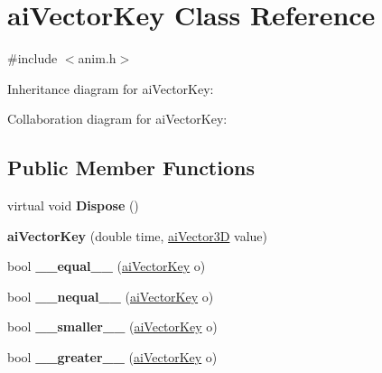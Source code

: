 \hypertarget{structai_vector_key}{\section{ai\+Vector\+Key Class Reference}
\label{structai_vector_key}
}


{\ttfamily \#include $<$anim.\+h$>$}



Inheritance diagram for ai\+Vector\+Key\+:


Collaboration diagram for ai\+Vector\+Key\+:
\subsection*{Public Member Functions}
\begin{DoxyCompactItemize}
\item 
\hypertarget{structai_vector_key_a17f1651da042834760e53b391bf48ff4}{virtual void {\bfseries Dispose} ()}\label{structai_vector_key_a17f1651da042834760e53b391bf48ff4}

\item 
\hypertarget{structai_vector_key_a1d870ec9ba129125116abaefb58e4d91}{{\bfseries ai\+Vector\+Key} (double time, \hyperlink{structai_vector3_d}{ai\+Vector3\+D} value)}\label{structai_vector_key_a1d870ec9ba129125116abaefb58e4d91}

\item 
\hypertarget{structai_vector_key_a476bf5489be1375424368f2be8231c96}{bool {\bfseries \+\_\+\+\_\+equal\+\_\+\+\_\+} (\hyperlink{structai_vector_key}{ai\+Vector\+Key} o)}\label{structai_vector_key_a476bf5489be1375424368f2be8231c96}

\item 
\hypertarget{structai_vector_key_a6f69d08200e6a83aa9b463df85ced805}{bool {\bfseries \+\_\+\+\_\+nequal\+\_\+\+\_\+} (\hyperlink{structai_vector_key}{ai\+Vector\+Key} o)}\label{structai_vector_key_a6f69d08200e6a83aa9b463df85ced805}

\item 
\hypertarget{structai_vector_key_a0555503a33d7d3639b7a9a7e0181c102}{bool {\bfseries \+\_\+\+\_\+smaller\+\_\+\+\_\+} (\hyperlink{structai_vector_key}{ai\+Vector\+Key} o)}\label{structai_vector_key_a0555503a33d7d3639b7a9a7e0181c102}

\item 
\hypertarget{structai_vector_key_aefa5cd947ea8dc12a29dfbef1e160de7}{bool {\bfseries \+\_\+\+\_\+greater\+\_\+\+\_\+} (\hyperlink{structai_vector_key}{ai\+Vector\+Key} o)}\label{structai_vector_key_aefa5cd947ea8dc12a29dfbef1e160de7}

\end{DoxyCompactItemize}
